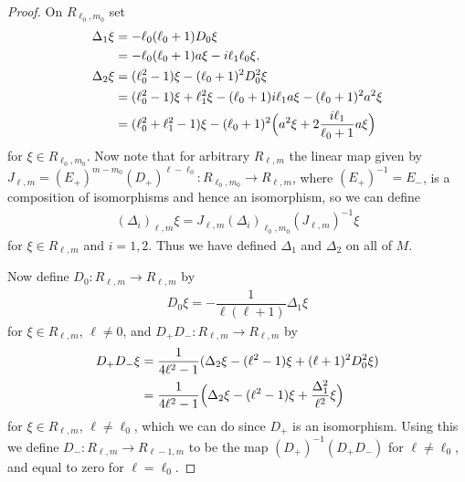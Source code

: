 \begin{proof}
  On $R_{\ell_0,m_0}$ set 
  \begin{align}
    \begin{aligned}\label{eq:DeltasRell0m0}
      \Delta_1 \xi &= -\ell_0(\ell_0+1)D_0\xi \\
      &= -\ell_0(\ell_0+1)a\xi - i\ell_1\ell_0\xi, \\
      \Delta_2 \xi &= (\ell_0^2-1)\xi - (\ell_0+1)^2D_0^2\xi \\
      &= (\ell_0^2-1)\xi + \ell_1^2\xi - (\ell_0+1)i\ell_1a\xi - (\ell_0+1)^2a^2\xi \\
      &= (\ell_0^2+\ell_1^2-1)\xi - (\ell_0+1)^2\Bigl( a^2\xi + 2\dfrac{i\ell_1}{\ell_0+1}a\xi \Bigr)
    \end{aligned}
  \end{align}
  for $\xi \in R_{\ell_0,m_0}$. Now note that for arbitrary $R_{\ell,m}$ the linear map given by $J_{\ell,m}=(E_+)^{m-m_0}(D_+)^{\ell-\ell_0}\colon R_{\ell_0,m_0} \to R_{\ell,m}$, where $(E_+)^{-1} = E_-$, is a composition of isomorphisms and hence an isomorphism, so we can define 
  \begin{align*}
    (\Delta_i)_{\ell,m}\xi = J_{\ell,m}(\Delta_i)_{\ell_0,m_0} (J_{\ell,m})^{-1}\xi
  \end{align*}
  for $\xi\in R_{\ell,m}$ and $i=1,2$. Thus we have defined $\Delta_1$ and $\Delta_2$ on all of $M$.
  
  Now define $D_0\colon R_{\ell,m}\to R_{\ell,m}$ by 
  \begin{align}\label{eq:D0fromDelta1}
    D_0\xi = -\dfrac{1}{\ell(\ell+1)}\Delta_1 \xi
  \end{align}
  for $\xi\in R_{\ell,m}$, $\ell\neq 0$, and $D_+D_-\colon R_{\ell,m}\to R_{\ell,m}$ by 
  \begin{align}
    \begin{aligned}\label{eq:D+D-fromDeltas}
      D_+D_-\xi &= \dfrac{1}{4\ell^2-1}(\Delta_2\xi - (\ell^2-1)\xi + (\ell+1)^2D_0^2\xi) \\
      &= \dfrac{1}{4\ell^2-1}\Bigl(\Delta_2\xi - (\ell^2-1)\xi + \dfrac{\Delta_1^2}{\ell^2}\xi\Bigr)
    \end{aligned}
  \end{align}
  for $\xi \in R_{\ell,m}$, $\ell\neq \ell_0$, which we can do since $D_+$ is an isomorphism. Using this we define $D_-\colon R_{\ell,m}\to R_{\ell-1,m}$ to be the map $(D_+)^{-1}(D_+D_-)$ for $\ell\neq \ell_0$, and equal to zero for $\ell=\ell_0$. 


\end{proof}
